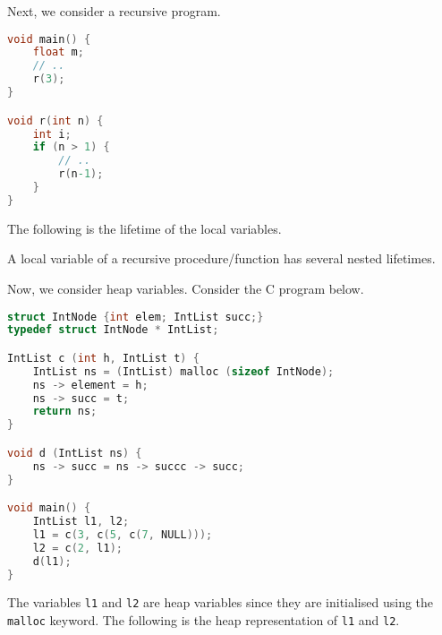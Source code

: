 \documentclass[a4paper, openany]{memoir}
\begin{document}
Next, we consider a recursive program.
\begin{lstlisting}[language=C]
void main() {
    float m;
    // ..
    r(3);
}

void r(int n) {
    int i;
    if (n > 1) {
        // ..
        r(n-1);
    }
}
\end{lstlisting}
The following is the lifetime of the local variables.
\begin{figure}[H]
    \centering
\end{figure}
\noindent A local variable of a recursive procedure/function has several nested lifetimes.

Now, we consider heap variables. Consider the C program below.
\begin{lstlisting}[language=C]
struct IntNode {int elem; IntList succ;}
typedef struct IntNode * IntList;

IntList c (int h, IntList t) {
    IntList ns = (IntList) malloc (sizeof IntNode);
    ns -> element = h;
    ns -> succ = t;
    return ns;
}

void d (IntList ns) {
    ns -> succ = ns -> succc -> succ;
}

void main() {
    IntList l1, l2;
    l1 = c(3, c(5, c(7, NULL)));
    l2 = c(2, l1);
    d(l1);
}
\end{lstlisting}
The variables \texttt{l1} and \texttt{l2} are heap variables since they are initialised using the \texttt{malloc} keyword. The following is the heap representation of \texttt{l1} and \texttt{l2}.
\end{document}
